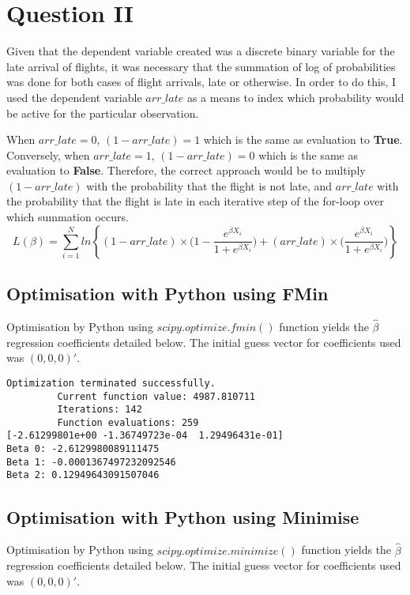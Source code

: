 \documentclass{article}
\begin{document}
\newpage
\section{Question II}
Given that the dependent variable created was a discrete binary variable for the late arrival of flights, it was necessary that the summation of log of probabilities was done for both cases of flight arrivals, late or otherwise. In order to do this, I used the dependent variable $arr\_late$ as a means to index which probability would be active for the particular observation.

When $arr\_late=0$, $(1-arr\_late)=1$ which is the same as evaluation to \textbf{True}. Conversely, when $arr\_late=1$, $(1-arr\_late)=0$ which is the same as evaluation to \textbf{False}. Therefore, the correct approach would be to multiply $(1-arr\_late)$ with the probability that the flight is not late, and $arr\_late$ with the probability that the flight is late  in each iterative step of the for-loop over which summation occurs.
$$L(\beta)=\sum\limits_{i=1}^N ln\left\{ (1-arr\_late)\times\Big(1-\frac{e^{\beta X_i}}{1+e^{\beta X_i}}\Big) + (arr\_late)\times\Big(\frac{e^{\beta X_i}}{1+e^{\beta X_i}}\Big)\right\} $$

\subsection{Optimisation with Python using FMin}
Optimisation by Python using $scipy.optimize.fmin()$ function yields the $\hat{\beta}$ regression coefficients detailed below. The initial guess vector for coefficients used was $(0, 0, 0)'$.

\begin{lstlisting}
Optimization terminated successfully.
         Current function value: 4987.810711
         Iterations: 142
         Function evaluations: 259
[-2.61299801e+00 -1.36749723e-04  1.29496431e-01]
Beta 0: -2.6129980089111475
Beta 1: -0.0001367497232092546
Beta 2: 0.12949643091507046
\end{lstlisting}

\subsection{Optimisation with Python using Minimise}
Optimisation by Python using $scipy.optimize.minimize()$ function yields the $\hat{\beta}$ regression coefficients detailed below. The initial guess vector for coefficients used was $(0, 0, 0)'$.
\end{document}
